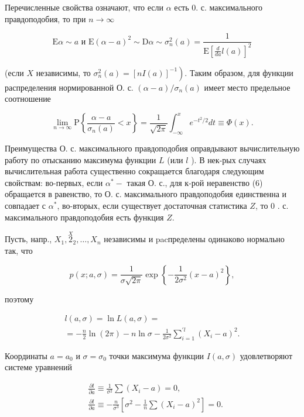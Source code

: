 \documentclass[10pt]{article}
\begin{document}
Перечисленные свойства означают, что если $\alpha$ есть 0. с. максимального правдоподобия, то при $n \rightarrow \infty$

\[
\mathrm{E} \alpha \sim a \text { и } \mathrm{E}(\alpha-a)^{2} \sim \mathrm{D} \alpha \sim \sigma_{n}^{2}(a)=\frac{1}{\mathrm{E}\left[\frac{d}{d a} l(a)\right]^{2}}
\]

(если $X$ независимы, то $\left.\sigma_{n}^{2}(a)=[n I(a)]^{-1}\right)$. Таким образом, для функции распределения нормированной О. с. $(\alpha-a) / \sigma_{n}(a)$ имеет место предельное соотношение

\[
\lim _{n \rightarrow \infty} \mathrm{P}\left\{\frac{\alpha-a}{\sigma_{n}(a)}<x\right\}=\frac{1}{\sqrt{2 \pi}} \int_{-\infty}^{x} e^{-t^{2} / 2} d t \equiv \Phi(x) .
\]

Преимущества О. с. максимального правдоподобия оправдывают вычислительную работу по отысканию максимума функции $L$ (или $l$ ). В нек-рых случаях вычислительная работа существенно сокращается благодаря следующим свойствам: во-первых, если $\alpha^{*}-$ такая О. с., для к-рой неравенство (6) обращается в равенство, то О. с. максимального правдоподобия единственна и совпадает с $\alpha^{*}$, во-вторых, если существует достаточная статистика $Z$, то 0 . с. максимального правдоподобия есть функция $Z$.

Пусть, напр., $X_{1}, \stackrel{X}{2}_{2}, \ldots, X_{n}$ независимы и pacпределены одинаково нормально так, что

\[
p(x ; a, \sigma)=\frac{1}{\sigma \sqrt{2 \pi}} \exp \left\{-\frac{1}{2 \sigma^{2}}(x-a)^{2}\right\},
\]

поэтому

\[
\begin{gathered}
l(a, \sigma)=\ln L(a, \sigma)= \\
=-\frac{n}{2} \ln (2 \pi)-n \ln \sigma-\frac{1}{2 \sigma^{2}} \sum_{i=1}^{\prime l}\left(X_{i}-a\right)^{2} .
\end{gathered}
\]

Координаты $a=a_{0}$ и $\sigma=\sigma_{0}$ точки максимума функции $I(a, \sigma)$ удовлетворяют системе уравнений

\[
\begin{aligned}
& \frac{\partial l}{\partial a} \equiv \frac{1}{\sigma^{2}} \sum\left(X_{i}-a\right)=0, \\
& \frac{\partial l}{\partial a} \equiv-\frac{n}{\sigma^{3}}\left[\sigma^{2}-\frac{1}{n} \sum\left(X_{i}-a\right)^{2}\right]=0 .
\end{aligned}
\]
\end{document}
